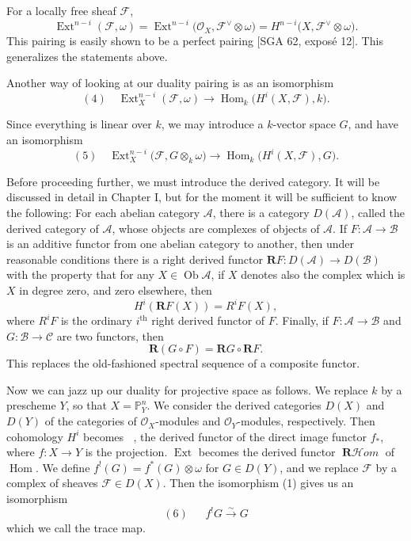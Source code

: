 \documentclass[12pt]{book}
\newcommand{\cat}[1]{\mathcal{#1}}
\newcommand{\sheaf}[1]{\mathcal{#1}}
\DeclareMathOperator{\Hom}{Hom}
\DeclareMathOperator{\Ext}{Ext}
\DeclareMathOperator{\Rfst}{\mathbf{R}f_*}
\DeclareMathOperator{\RHom}{\mathbf{R}\mathcal{H}\textit{om}}
\begin{document}
For a locally free sheaf \(\sheaf{F}\),
\[
\Ext^{n-i}(\sheaf{F},\omega)
= \Ext^{n-i}\bigl(\sheaf{O}_X,\sheaf{F}^{\vee} \otimes \omega\bigr)
= H^{n-i}\bigl(X,\sheaf{F}^{\vee} \otimes \omega\bigr).
\]
This pairing is easily shown to be a perfect pairing [SGA 62, exposé 12]. This generalizes the statements above.

Another way of looking at our duality pairing is as an isomorphism
\[
(4)\quad \Ext_{X}^{n-i}(\sheaf{F},\omega) \to \Hom_k\bigl(H^{i}(X,\sheaf{F}),k\bigr).
\]

Since everything is linear over \(k\), we may introduce a \(k\)-vector space \(G\), and have an isomorphism
\[
(5)\quad \Ext_{X}^{n-i}\bigl(\sheaf{F}, G \otimes_k \omega\bigr)
\to \Hom_k\bigl(H^{i}(X,\sheaf{F}), G\bigr).
\]

Before proceeding further, we must introduce the derived category. It will be discussed in detail in Chapter I, but for the moment it will be sufficient to know the following:
For each abelian category \(\cat{A}\), there is a category \(D(\cat{A})\), called the derived category of \(\cat{A}\), whose objects are complexes of objects of \(\cat{A}\). If \(F\colon \cat{A}\to\cat{B}\) is an additive functor from one abelian category to another, then under reasonable conditions there is a right derived functor
\(\mathbf{R}F\colon D(\cat{A})\to D(\cat{B})\)
with the property that for any \(X\in\operatorname{Ob}\cat{A}\), if \(X\) denotes also the complex which is \(X\) in degree zero, and zero elsewhere, then
\[
H^{i}(\mathbf{R}F(X)) = R^{i}F(X),
\]
where \(R^{i}F\) is the ordinary \(i^\text{th}\) right derived functor of \(F\). Finally, if \(F\colon\cat{A}\to\cat{B}\) and \(G\colon\cat{B}\to\cat{C}\) are two functors, then
\[
\mathbf{R}(G\circ F) = \mathbf{R}G \circ \mathbf{R}F.
\]
This replaces the old-fashioned spectral sequence of a composite functor.

Now we can jazz up our duality for projective space as follows. We replace \(k\) by a prescheme \(Y\), so that \(X=\mathbb{P}_Y^n\). We consider the derived categories \(D(X)\) and \(D(Y)\) of the categories of \(\sheaf{O}_X\)-modules and \(\sheaf{O}_Y\)-modules, respectively. Then cohomology \(H^i\) becomes \(\Rfst\), the derived functor of the direct image functor \(f_*\), where \(f\colon X\to Y\) is the projection. \(\Ext\) becomes the derived functor \(\RHom\) of \(\Hom\). We define \(f^!(G)=f^*(G)\otimes\omega\) for \(G\in D(Y)\), and we replace \(\sheaf{F}\) by a complex of sheaves \(\sheaf{F}\in D(X)\). Then the isomorphism (1) gives us an isomorphism
\[
(6)\quad \Rfst f^! G \stackrel{\sim}{\to} G
\]
which we call the trace map.
\end{document}
